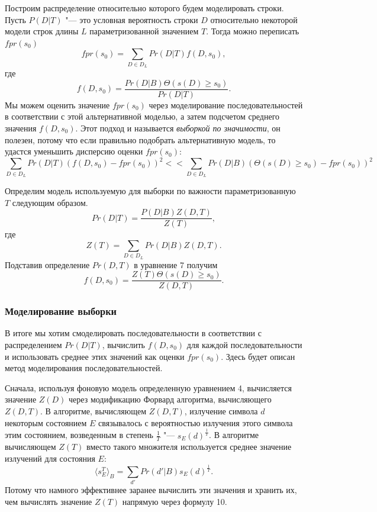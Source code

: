 \documentclass[]{article}
\begin{document}
			Построим распределение относительно которого будем моделировать строки. Пусть $P(D|T)$ "--- это условная вероятность строки $D$ относительно некоторой модели строк длины $L$ параметризованной значением $T$. Тогда можно переписать $fpr(s_{0})$
			\begin{equation}
				fpr(s_{0}) = \sum_{D \in D_{L}} Pr(D|T) f(D,s_{0}),
			\end{equation}
			где
			\begin{equation}
				f(D,s_{0}) = \frac{Pr(D|B) \Theta(s(D) \geq s_{0})}{Pr(D|T)}.
			\end{equation}
			Мы можем оценить значение $fpr(s_{0})$ через моделирование последовательностей в соответствии с этой альтернативной моделью, а затем подсчетом среднего значения $f(D,s_{0})$. Этот подход и называется \textit{выборкой по значимости}, он полезен, потому что если правильно подобрать альтернативную модель, то удастся уменьшить дисперсию оценки $fpr(s_{0})$:
			\begin{equation}
				\sum_{D \in D_{L}}Pr(D|T)(f(D, s_{0})-fpr(s_{0}))^{2} <\!\!< \sum_{D \in D_{L}}Pr(D|B)(\Theta(s(D) \geq s_{0})-fpr(s_{0}))^2
			\end{equation}
		
			Определим модель используемую для выборки по важности параметризованную $T$ следующим образом.
			\begin{equation}
				Pr(D|T) = \frac{P(D|B)Z(D,T)}{Z(T)},
			\end{equation}							
			где 
			\begin{equation}
				Z(T) = \sum_{D \in D_{L}}Pr(D|B)Z(D,T).
			\end{equation}	
			Подставив определение $Pr(D,T)$ в уравнение 7 получим 
			\begin{equation}
				f(D,s_{0}) = \frac{Z(T)\Theta(s(D) \geq s_{0})}{Z(D,T)}.
			\end{equation}		
		
			\subsubsection{Моделирование выборки}
			В итоге мы хотим смоделировать последовательности в соответствии с распределением $Pr(D|T)$, вычислить $f(D, s_{0})$ для каждой последовательности и использовать среднее этих значений как оценки $fpr(s_{0})$. Здесь будет описан метод моделирования последовательностей.
			
			Сначала, используя фоновую модель определенную уравнением 4, вычисляется значение $Z(D)$ через модификацию Форвард алгоритма, вычисляющего $Z(D,T)$. В алгоритме, вычисляющем $Z(D,T)$, излучение символа $d$ некоторым состоянием $E$ связывалось с вероятностью излучения этого символа этим состоянием, возведенным в степень $\frac{1}{T}$ "--- $s_{E}(d)^{\frac{1}{T}}$. В алгоритме вычисляющем $Z(T)$ вместо такого множителя используется среднее значение излучений для состояния $E$:
			\begin{equation}
				\langle s_{E}^{T} \rangle_{B} = \sum_{d'}Pr(d'|B)s_{E}(d)^{\frac{1}{T}}.
			\end{equation}					
			Потому что намного эффективнее заранее вычислить эти значения и хранить их, чем вычислять значение $Z(T)$ напрямую через формулу 10.
			
\end{document}
